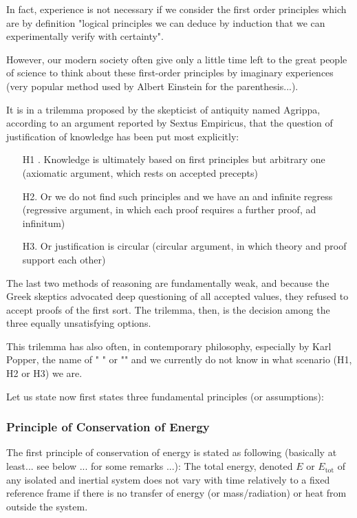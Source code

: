 	In fact, experience is not necessary if we consider the first order principles which are by definition "logical principles we can deduce by induction that we can experimentally verify with certainty".

	However, our modern society often give only a little time left to the great people of science to think about these first-order principles by imaginary experiences (very popular method used by Albert Einstein for the parenthesis...).

	It is in a trilemma proposed by the skepticist of antiquity named Agrippa, according to an argument reported by Sextus Empiricus, that the question of justification of knowledge has been put most explicitly:
	\begin{enumerate}
		\item[H1]. Knowledge is ultimately based on first principles but arbitrary one (axiomatic argument, which rests on accepted precepts)

		\item[H2.] Or we do not find such principles and we have an and infinite regress (regressive argument, in which each proof requires a further proof, ad infinitum)

		\item[H3.] Or justification is circular (circular argument, in which theory and proof support each other)
	\end{enumerate}
	The last two methods of reasoning are fundamentally weak, and because the Greek skeptics advocated deep questioning of all accepted values, they refused to accept proofs of the first sort. The trilemma, then, is the decision among the three equally unsatisfying options.
	
	This trilemma has also often, in contemporary philosophy, especially by Karl Popper, the name of " " or "" and we currently do not know in what scenario (H1, H2 or H3) we are.

	Let us state now first states three  fundamental principles (or assumptions):
	
	\subsubsection{Principle of Conservation of Energy}
	The first principle of conservation of energy is stated as following (basically at least... see below ... for some remarks ...): The total energy, denoted $E$ or $E_\text{tot}$ of any isolated and inertial system does not vary with time relatively to a fixed reference frame if there is no transfer of energy (or mass/radiation) or heat from outside the system.
	
